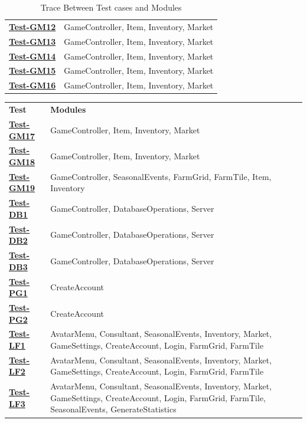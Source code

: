 \documentclass[12pt, titlepage]{article}
\begin{document}
\begin{table}[H]
\begin{tabular}{p{} p{}}
\hyperref[Test-GM12]{\textbf{Test-GM12}} & GameController, Item, Inventory, Market\\
\hyperref[Test-GM13]{\textbf{Test-GM13}} & GameController, Item, Inventory, Market\\
\hyperref[Test-GM14]{\textbf{Test-GM14}} & GameController, Item, Inventory, Market\\
\hyperref[Test-GM15]{\textbf{Test-GM15}} & GameController, Item, Inventory, Market\\
\hyperref[Test-GM16]{\textbf{Test-GM16}} & GameController, Item, Inventory, Market\\
\bottomrule
\end{tabular}
\caption{Trace Between Test cases and Modules}
\label{TblACT}
\end{table}

\begin{table}[H]
\centering
\begin{tabular}{p{} p{}}
\toprule
\textbf{Test} & \textbf{Modules}\\
\hyperref[Test-GM17]{\textbf{Test-GM17}} & GameController, Item, Inventory, Market\\
\hyperref[Test-GM18]{\textbf{Test-GM18}} & GameController, Item, Inventory, Market\\
\hyperref[Test-GM19]{\textbf{Test-GM19}} & GameController, SeasonalEvents, FarmGrid, FarmTile, Item, Inventory\\
\hyperref[Test-DB1]{\textbf{Test-DB1}} & GameController, DatabaseOperations, Server\\
\hyperref[Test-DB2]{\textbf{Test-DB2}} & GameController, DatabaseOperations, Server\\
\hyperref[Test-DB3]{\textbf{Test-DB3}} & GameController, DatabaseOperations, Server\\
\hyperref[Test-PG1]{\textbf{Test-PG1}} & CreateAccount\\
\hyperref[Test-PG2]{\textbf{Test-PG2}} & CreateAccount\\
\hyperref[Test-LF1]{\textbf{Test-LF1}} & AvatarMenu, Consultant, SeasonalEvents, Inventory, Market, GameSettings, CreateAccount, Login, FarmGrid, FarmTile\\
\hyperref[Test-LF2]{\textbf{Test-LF2}} & AvatarMenu, Consultant, SeasonalEvents, Inventory, Market, GameSettings, CreateAccount, Login, FarmGrid, FarmTile\\
\hyperref[Test-LF3]{\textbf{Test-LF3}} & AvatarMenu, Consultant, SeasonalEvents, Inventory, Market, GameSettings, CreateAccount, Login, FarmGrid, FarmTile, SeasonalEvents, GenerateStatistics\\

\end{tabular}
\end{table}
\end{document}
